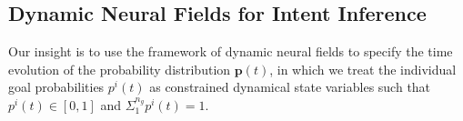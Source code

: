 \documentclass[journal]{IEEEtran}
\begin{document}
\subsection{Dynamic Neural Fields for Intent Inference}\label{ssec:dft_ii}

Our insight is to use the framework of dynamic neural fields to specify the time evolution of the probability distribution $\boldsymbol{p}(t)$, in which we treat the individual goal probabilities $p^i(t)$ as constrained dynamical state variables such that $p^i(t) \in [0, 1]$ and $\Sigma_{1}^{n_g}p^{i}(t) = 1$. 
\end{document}
